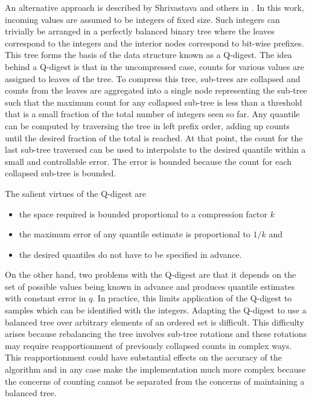 \documentclass[11pt]{amsart}
\begin{document}
An alternative approach is described by Shrivastava and others in \cite{qdigest}.  In this work, incoming values are assumed to be integers of fixed size. Such integers can trivially be arranged in a perfectly balanced binary tree where the leaves correspond to the integers and the interior nodes correspond to bit-wise prefixes. This tree forms the basis of the data structure known as a Q-digest.  The idea behind a Q-digest is that in the uncompressed case, counts for various values are assigned to leaves of the tree.  To compress this tree, sub-trees are collapsed and counts from the leaves are aggregated into a single node representing the sub-tree such that the maximum count for any collapsed sub-tree is less than a threshold that is a small fraction of the total number of integers seen so far.  Any quantile can be computed by traversing the tree in left prefix order, adding up counts until the desired fraction of the total is reached.  At that point, the count for the last sub-tree traversed can be used to interpolate to the desired quantile within a small and controllable error.  The error is bounded because the count for each collapsed sub-tree is bounded.

The salient virtues of the Q-digest are
\begin{itemize}[nosep, topsep=-10pt]
\item the space required is bounded proportional to a compression factor $k$
\item the maximum error of any quantile estimate is proportional to $1/k$ and
\item the desired quantiles do not have to be specified in advance.
\vspace{10pt}
\end{itemize}

On the other hand, two problems with the Q-digest are that it depends on the set of possible values being known in advance and produces quantile estimates with constant error in $q$. In practice, this limits application of the Q-digest to samples which can be identified with the integers. Adapting the Q-digest to use a balanced tree over arbitrary elements of an ordered set is difficult.  This difficulty arises because rebalancing the tree involves sub-tree rotations and these rotations may require reapportionment of previously collapsed counts in complex ways.  This reapportionment could have substantial effects on the accuracy of the algorithm and in any case make the implementation much more complex because the concerns of counting cannot be separated from the concerns of maintaining a balanced tree.  
\end{document}

